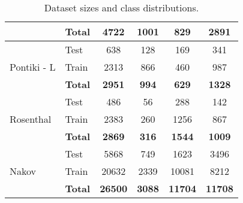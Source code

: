\documentclass[../../fyp.tex]{subfiles}
\begin{document}
\begin{table}
\begin{tabular}{|l|l|c|ccc|}
		                                       & \textbf{Total}                      & \textbf{4722}    & \textbf{1001}     & \textbf{829}     & \textbf{2891}     \\ \hline\hline
		\multirow{3}{*}{Pontiki - L}           & Test                                & 638              & 128               & 169              & 341               \\
		                                       & Train                               & 2313             & 866               & 460              & 987              \\ \cline{2-6}
		                                       & \textbf{Total}                      & \textbf{2951}    & \textbf{994}      & \textbf{629}     & \textbf{1328}     \\ \hline\hline
		\multirow{3}{*}{Rosenthal}             & Test                                & 486              & 56                & 288              & 142               \\
		                                       & Train                               & 2383             & 260               & 1256             & 867               \\ \cline{2-6}
		                                       & \textbf{Total}                      & \textbf{2869}    & \textbf{316}      & \textbf{1544}    & \textbf{1009}     \\ \hline\hline
		\multirow{3}{*}{Nakov}                 & Test                                & 5868             & 749               & 1623             & 3496              \\
		                                       & Train                               & 20632            & 2339              & 10081            & 8212              \\ \cline{2-6}
		                                       & \textbf{Total}                      & \textbf{26500}   & \textbf{3088}     & \textbf{11704}   & \textbf{11708}    \\ \hline
	\end{tabular}
	\caption{Dataset sizes and class distributions. }
	\label{tab:dataset_class_dists}
\end{table}
\end{document}

